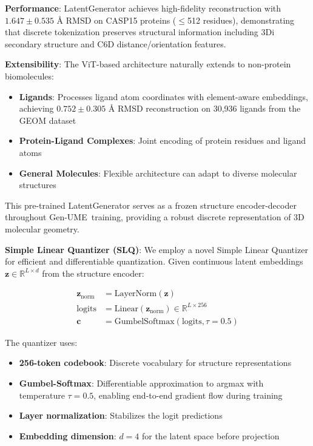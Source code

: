 \documentclass[11pt,a4paper]{article}
\newcommand{\genume}{Gen-UME}
\newcommand{\real}{\mathbb{R}}
\begin{document}
\textbf{Performance}: LatentGenerator achieves high-fidelity reconstruction with $1.647 \pm 0.535$ Å RMSD on CASP15 proteins ($\leq$512 residues), demonstrating that discrete tokenization preserves structural information including 3Di secondary structure and C6D distance/orientation features.

\textbf{Extensibility}: The ViT-based architecture naturally extends to non-protein biomolecules:
\begin{itemize}
\item \textbf{Ligands}: Processes ligand atom coordinates with element-aware embeddings, achieving $0.752 \pm 0.305$ Å RMSD reconstruction on 30,936 ligands from the GEOM dataset \cite{axelrod2022}
\item \textbf{Protein-Ligand Complexes}: Joint encoding of protein residues and ligand atoms
\item \textbf{General Molecules}: Flexible architecture can adapt to diverse molecular structures
\end{itemize}

This pre-trained LatentGenerator serves as a frozen structure encoder-decoder throughout \genume~training, providing a robust discrete representation of 3D molecular geometry.

\textbf{Simple Linear Quantizer (SLQ)}: We employ a novel Simple Linear Quantizer for efficient and differentiable quantization. Given continuous latent embeddings $\mathbf{z} \in \real^{L \times d}$ from the structure encoder:

\begin{align}
\mathbf{z}_{\text{norm}} &= \text{LayerNorm}(\mathbf{z}) \\
\text{logits} &= \text{Linear}(\mathbf{z}_{\text{norm}}) \in \real^{L \times 256} \\
\mathbf{c} &= \text{GumbelSoftmax}(\text{logits}, \tau=0.5)
\end{align}

The quantizer uses:
\begin{itemize}
\item \textbf{256-token codebook}: Discrete vocabulary for structure representations
\item \textbf{Gumbel-Softmax}: Differentiable approximation to argmax with temperature $\tau=0.5$, enabling end-to-end gradient flow during training
\item \textbf{Layer normalization}: Stabilizes the logit predictions
\item \textbf{Embedding dimension}: $d=4$ for the latent space before projection
\end{itemize}
\end{document}
